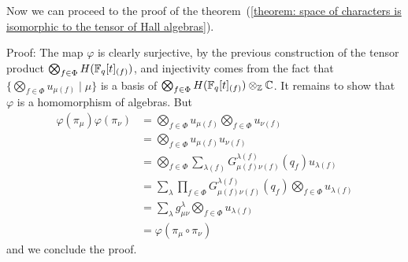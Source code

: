 Now we can proceed to the proof of the theorem~(\ref{theorem: space of characters is isomorphic to the tensor of Hall algebras}).\par
Proof: The map $\varphi$ is clearly surjective, by the previous construction of the tensor product $\bigotimes_{f\in\Phi}H(\mathbb{F}_q[t]_{(f)})$, and injectivity comes from the fact that $\{\bigotimes_{f\in\Phi}u_{\mu(f)}\;|\;\mu\}$ is a basis of $\bigotimes_{f\in\Phi}H(\mathbb{F}_q[t]_{(f)})\otimes_{\mathbb{Z}}\mathbb{C}$. It remains to show that $\varphi$ is a homomorphism of algebras. But
\begin{equation}
    \begin{split}
\varphi(\pi_\mu)\varphi(\pi_\nu)&=\bigotimes_{f\in\Phi}u_{\mu(f)}\bigotimes_{f\in\Phi}u_{\nu(f)}\\
&=\bigotimes_{f\in\Phi}u_{\mu(f)}u_{\nu(f)}\\
&=\bigotimes_{f\in\Phi}\sum_{\lambda(f)}G_{\mu(f)\nu(f)}^{\lambda(f)}(q_f)u_{\lambda(f)}\\
&=\sum_\lambda \prod_{f\in\Phi}G_{\mu(f)\nu(f)}^{\lambda(f)}(q_f)\bigotimes_{f\in\Phi}u_{\lambda(f)}\\
&=\sum_\lambda g_{\mu\nu}^{\lambda}\bigotimes_{f\in\Phi}u_{\lambda(f)}\\
&=\varphi(\pi_\mu\circ\pi_\nu)
    \end{split}
\end{equation}
and we conclude the proof.
